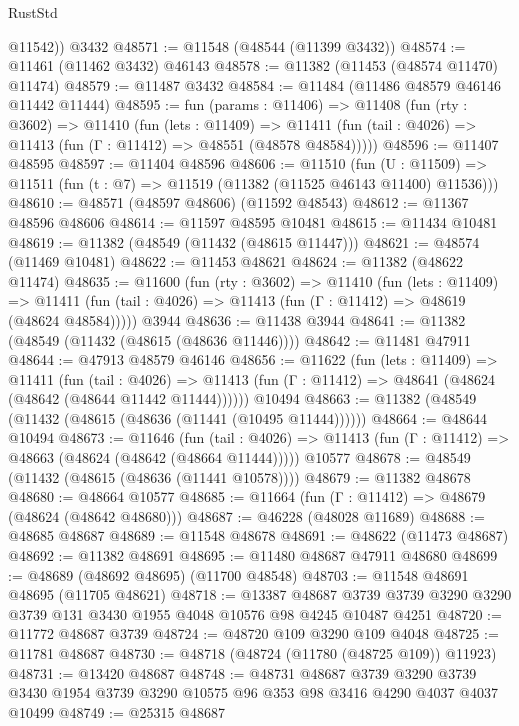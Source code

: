 \begin{lexlean}{RustStd}
\begin{coremodule}
        @11542))
    @3432
@48571 := @11548 (@48544 (@11399 @3432))
@48574 := @11461 (@11462 @3432) @46143
@48578 := @11382 (@11453 (@48574 @11470) @11474)
@48579 := @11487 @3432
@48584 := @11484 (@11486 @48579 @46146 @11442 @11444)
@48595 := fun (params : @11406) =>
  @11408
    (fun (rty : @3602) =>
    @11410
      (fun (lets : @11409) =>
      @11411 (fun (tail : @4026) => @11413 (fun (Γ : @11412) => @48551 (@48578 @48584)))))
@48596 := @11407 @48595
@48597 := @11404 @48596
@48606 := @11510
    (fun (U : @11509) => @11511 (fun (t : @7) => @11519 (@11382 (@11525 @46143 @11400) @11536)))
@48610 := @48571 (@48597 @48606) (@11592 @48543)
@48612 := @11367 @48596 @48606
@48614 := @11597 @48595 @10481
@48615 := @11434 @10481
@48619 := @11382 (@48549 (@11432 (@48615 @11447)))
@48621 := @48574 (@11469 @10481)
@48622 := @11453 @48621
@48624 := @11382 (@48622 @11474)
@48635 := @11600
    (fun (rty : @3602) =>
    @11410
      (fun (lets : @11409) =>
      @11411 (fun (tail : @4026) => @11413 (fun (Γ : @11412) => @48619 (@48624 @48584)))))
    @3944
@48636 := @11438 @3944
@48641 := @11382 (@48549 (@11432 (@48615 (@48636 @11446))))
@48642 := @11481 @47911
@48644 := @47913 @48579 @46146
@48656 := @11622
    (fun (lets : @11409) =>
    @11411
      (fun (tail : @4026) =>
      @11413 (fun (Γ : @11412) => @48641 (@48624 (@48642 (@48644 @11442 @11444))))))
    @10494
@48663 := @11382 (@48549 (@11432 (@48615 (@48636 (@11441 (@10495 @11444))))))
@48664 := @48644 @10494
@48673 := @11646
    (fun (tail : @4026) => @11413 (fun (Γ : @11412) => @48663 (@48624 (@48642 (@48664 @11444)))))
    @10577
@48678 := @48549 (@11432 (@48615 (@48636 (@11441 @10578))))
@48679 := @11382 @48678
@48680 := @48664 @10577
@48685 := @11664 (fun (Γ : @11412) => @48679 (@48624 (@48642 @48680)))
@48687 := @46228 (@48028 @11689)
@48688 := @48685 @48687
@48689 := @11548 @48678
@48691 := @48622 (@11473 @48687)
@48692 := @11382 @48691
@48695 := @11480 @48687 @47911 @48680
@48699 := @48689 (@48692 @48695) (@11700 @48548)
@48703 := @11548 @48691 @48695 (@11705 @48621)
@48718 := @13387
    @48687
    @3739
    @3739
    @3290
    @3290
    @3739
    @131
    @3430
    @1955
    @4048
    @10576
    @98
    @4245
    @10487
    @4251
@48720 := @11772 @48687 @3739
@48724 := @48720 @109 @3290 @109 @4048
@48725 := @11781 @48687
@48730 := @48718 (@48724 (@11780 (@48725 @109)) @11923)
@48731 := @13420 @48687
@48748 := @48731
    @48687
    @3739
    @3290
    @3739
    @3430
    @1954
    @3739
    @3290
    @10575
    @96
    @353
    @98
    @3416
    @4290
    @4037
    @4037
    @10499
@48749 := @25315 @48687

\end{coremodule}
\end{lexlean}
